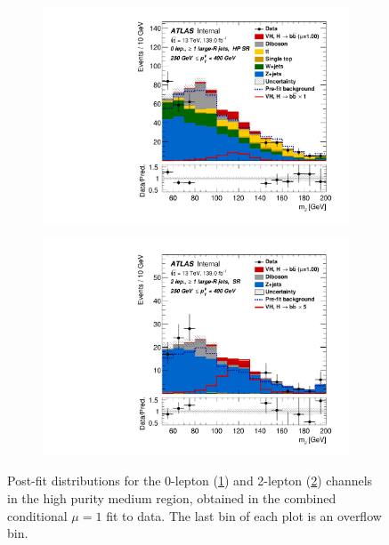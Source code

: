 \begin{figure}[!htbp]
    \centering
    \begin{subfigure}{.4\textwidth}
      \centering
      \includegraphics[width=\textwidth]{chapters/6.vhbb_boosted/figs/Region_BMax400_BMin250_incFat1_Fat1_Y6051_DSRnoaddbjetsr_T2_L0_distmBB_J0_GlobalFit_conditionnal_mu1.pdf}
      \caption{}
      \label{fig:vhbb postfit plots sub1}
    \end{subfigure}%
    \begin{subfigure}{.4\textwidth}
      \centering
      \includegraphics[width=\textwidth]{chapters/6.vhbb_boosted/figs/Region_distmBB_J0_L2_T2_DSR_Y6051_incJet1_Fat1_incFat1_BMin250_BMax400_GlobalFit_conditionnal_mu1.pdf}
      \caption{}
      \label{fig:vhbb postfit plots sub2}
    \end{subfigure}
    \vspace{-0.5em}
    \caption{Post-fit distributions for the 0-lepton (\ref{fig:vhbb postfit plots sub1}) and 2-lepton (\ref{fig:vhbb postfit plots sub2}) channels in the high purity medium \pTV region, obtained in the combined conditional $\mu=1$ fit to data. The last bin of each plot is an overflow bin.}
    \label{fig:vhbb postfit plots}
\end{figure}
%

